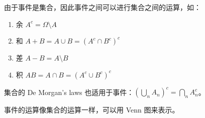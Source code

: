 \documentclass[../main.tex]{subfiles}
\begin{document}
由于事件是集合，因此事件之间可以进行集合之间的运算，如：
\begin{enumerate}
    \item 余 $A^c=\Omega\setminus A$
    \item 和 $A+B=A\cup B=(A^c\cap B^c)^c$
    \item 差 $A-B=A\setminus B$
    \item 积 $AB=A\cap B=(A^c\cup B^c)^c$
\end{enumerate}

集合的 De Morgan's laws 也适用于事件：$(\bigcup_n A_n)^c=\bigcap_n A_n^c$。

事件的运算像集合的运算一样，可以用 Venn 图来表示。
\end{document}
